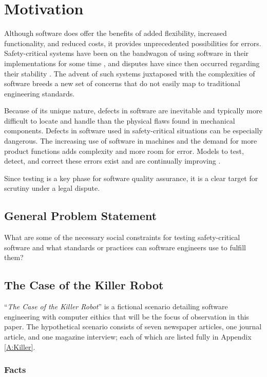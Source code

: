 \chapter{Motivation}\label{C:Motivation}

Although software does offer the benefits of added flexibility, increased
functionality, and reduced costs, it provides unprecedented possibilities for
errors. Safety-critical systems have been on the bandwagon of using software in
their implementations for some time \cite{Graupe78,Hurtig94}, and disputes have
since then occurred regarding their stability \cite{Leveson93,Maisel05}. The 
advent of such systems juxtaposed with the complexities of software breeds a new
set of concerns that do not easily map to traditional engineering standards.

Because of its unique nature, defects in software are inevitable and typically
more difficult to locate and handle than the physical flaws found in mechanical
components. Defects in software used in safety-critical situations can be
especially dangerous. The increasing use of software in machines and the demand
for more product functions adds complexity and more room for error. Models to
test, detect, and correct these errors exist and are continually improving
\cite{Parnas90}.

Since testing is a key phase for software quality assurance, it is a clear
target for scrutiny under a legal dispute.

\section{General Problem Statement}
What are some of the necessary social constraints for testing safety-critical
software and what standards or practices can software engineers use to fulfill
them?

\section{The Case of the Killer Robot}
``\textit{The Case of the Killer Robot}'' \cite{Epstein96} is a fictional  
scenario detailing software engineering with computer eithics that will be the
focus of observation in this paper. The hypothetical scenario consists of seven
newspaper articles, one journal article, and one magazine interview; each of
which are listed fully in Appendix \ref{A:Killer}.

\subsection{Facts}

